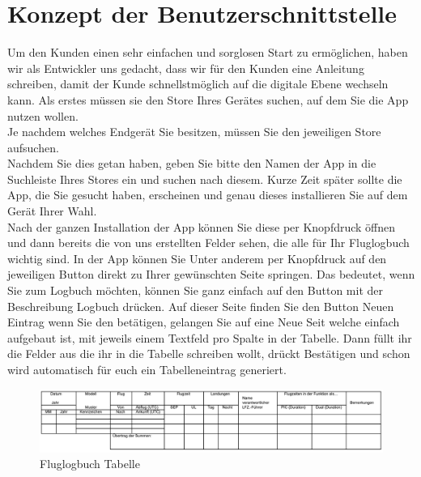 \documentclass[a4paper]{article} %
\begin{document}
    \section{Konzept der Benutzerschnittstelle}
    \vspace{1cm}
    Um den Kunden einen sehr einfachen und sorglosen Start zu ermöglichen, haben wir als Entwickler uns gedacht, dass wir für den Kunden eine Anleitung schreiben, damit der Kunde schnellstmöglich auf die digitale Ebene wechseln kann. Als erstes müssen sie den Store Ihres Gerätes suchen, auf dem Sie die App nutzen wollen.\\ Je nachdem welches Endgerät Sie besitzen, müssen Sie den jeweiligen Store aufsuchen.\\ Nachdem Sie dies getan haben, geben Sie bitte den Namen der App in die Suchleiste Ihres Stores ein und suchen nach diesem. Kurze Zeit später sollte die App, die Sie gesucht haben, erscheinen und genau dieses installieren Sie auf dem Gerät Ihrer Wahl. \\Nach der ganzen Installation der App können Sie diese per Knopfdruck öffnen und dann bereits die von uns erstellten Felder sehen, die alle für Ihr Fluglogbuch wichtig sind. In der App können Sie Unter anderem per Knopfdruck auf den jeweiligen Button direkt zu Ihrer gewünschten Seite springen. Das bedeutet, wenn Sie zum Logbuch möchten, können Sie ganz einfach auf den Button mit der Beschreibung \glqq{}Logbuch\grqq{} drücken. Auf dieser Seite finden Sie den Button \glqq{}Neuen Eintrag\grqq{} wenn Sie den betätigen, gelangen Sie auf eine Neue Seit welche einfach aufgebaut ist, mit jeweils einem Textfeld pro Spalte in der Tabelle. Dann füllt ihr die Felder aus die ihr in die Tabelle schreiben wollt, drückt Bestätigen und schon wird automatisch für euch ein Tabelleneintrag generiert. \\
    \begin{figure}[h!]
        \centering
        \includegraphics[width=17cm]{Logbuch.png}
        \caption{Fluglogbuch Tabelle}
        \label{fig:my_label}
    \end{figure}
    
\end{document}
